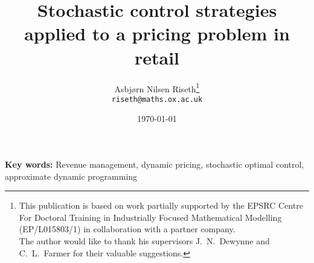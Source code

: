 \documentclass[a4paper,12pt]{article}
\title{Stochastic control strategies applied to a
  pricing problem in retail}
\author{Asbj{\o}rn Nilsen Riseth\thanks{
    This publication is based on work partially supported by the EPSRC
    Centre For Doctoral Training in Industrially Focused Mathematical
    Modelling (EP/L015803/1) in collaboration with a partner
    company.\\
    The author would like to thank his supervisors
    J.~N.~Dewynne and C.~L.~Farmer for their valuable suggestions.}\\
  \texttt{riseth@maths.ox.ac.uk}}
\affil{Mathematical Institute, University
  of Oxford, OX2 6GG.}
\date{\today}
\def\biblio{}
\begin{document}
\maketitle
\listoftodos

\def\biblio{}
\def\listoftodos{}



\vspace{1em}\noindent
\textbf{Key words:} Revenue management, dynamic pricing, stochastic
optimal control,
approximate dynamic programming





% 


\clearpage





\end{document}
